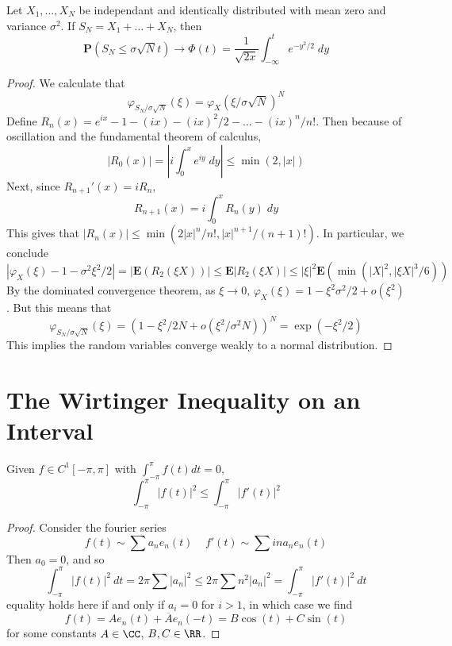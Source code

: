 \begin{theorem}
    Let $X_1, \dots, X_N$ be independant and identically distributed with mean zero and variance $\sigma^2$. If $S_N = X_1 + \dots + X_N$, then
    \[ \mathbf{P}(S_N \leq \sigma \sqrt{N} t) \to \Phi(t) = \frac{1}{\sqrt{2x}} \int_{-\infty}^t e^{-y^2/2}\; dy \]
\end{theorem}
\begin{proof}
    We calculate that
    \[ \varphi_{S_N/\sigma \sqrt{N}}(\xi) = \varphi_X(\xi/\sigma \sqrt{N})^N \]
    Define $R_n(x) = e^{ix} - 1 - (ix) - (ix)^2/2 - \dots - (ix)^n/n!$. Then because of oscillation and the fundamental theorem of calculus,
    \[ |R_0(x)| = \left| i \int_0^x e^{iy}\; dy \right| \leq \min(2,|x|) \]
    Next, since $R_{n+1}'(x) = i R_n$,
    \[ R_{n+1}(x) = i  \int_0^x R_n(y)\; dy \]
    This gives that $|R_n(x)| \leq \min(2|x|^n/n!,|x|^{n+1}/(n+1)!)$. In particular, we conclude
    \[ |\varphi_X(\xi) - 1 - \sigma^2 \xi^2/2| = |\mathbf{E}(R_2(\xi X))| \leq \mathbf{E}|R_2(\xi X)| \leq |\xi|^2 \mathbf{E} \left( \min \left( |X|^2, |\xi X|^3/6 \right) \right) \]
    By the dominated convergence theorem, as $\xi \to 0$, $\varphi_X(\xi) = 1 - \xi^2 \sigma^2/2 + o(\xi^2)$. But this means that
    \[ \varphi_{S_N/\sigma \sqrt{N}}(\xi) = (1 - \xi^2 / 2 N + o(\xi^2/\sigma^2 N))^N = \exp(-\xi^2/2) \]
    This implies the random variables converge weakly to a normal distribution.
\end{proof}


\section{The Wirtinger Inequality on an Interval}

\begin{theorem}
    Given $f \in C^1[-\pi,\pi]$ with $\int_{-\pi}^\pi f(t) dt = 0$,
    \[ \int_{-\pi}^\pi |f(t)|^2 \leq \int_{-\pi}^\pi |f'(t)|^2 \]
\end{theorem}
\begin{proof}
    Consider the fourier series
    \[ f(t) \sim \sum a_n e_n(t)\ \ \ \ \ f'(t) \sim \sum in a_n e_n(t) \]
    Then $a_0 = 0$, and so
    \[ \int_{-\pi}^\pi |f(t)|^2\ dt = 2 \pi \sum |a_n|^2 \leq 2 \pi \sum n^2 |a_n|^2 = \int_{-\pi}^\pi |f'(t)|^2\ dt \]
    equality holds here if and only if $a_i = 0$ for $i > 1$, in which case we find
    \[ f(t) = A e_n(t) + \overline{A} e_n(-t) = B \cos(t) + C \sin(t) \]
    for some constants $A \in \CC$, $B,C \in \RR$.
\end{proof}

